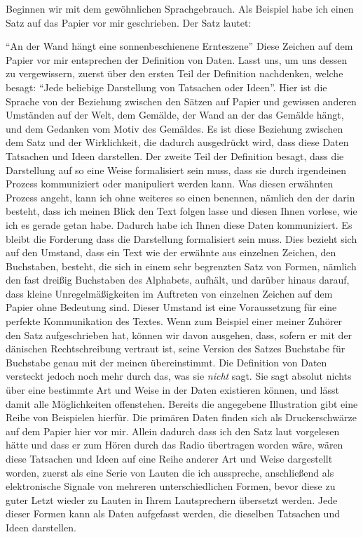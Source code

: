 {Beginnen wir mit dem gewöhnlichen Sprachgebrauch. Als Beispiel habe ich einen Satz auf das Papier vor mir geschrieben. Der Satz lautet: 

\enquote{An der Wand hängt eine sonnenbeschienene Ernteszene} Diese Zeichen auf dem Papier vor mir entsprechen der Definition von Daten. Lasst uns, um uns dessen zu vergewissern, zuerst über den ersten Teil der Definition nachdenken, welche besagt: \enquote{Jede beliebige Darstellung von Tatsachen oder Ideen}. Hier ist die Sprache von der Beziehung zwischen den Sätzen auf Papier und gewissen anderen Umständen auf der Welt, dem Gemälde, der Wand an der das Gemälde hängt, und dem Gedanken vom Motiv des Gemäldes. Es ist diese Beziehung zwischen dem Satz und der Wirklichkeit, die dadurch ausgedrückt wird, dass diese Daten Tatsachen und Ideen darstellen. Der zweite Teil der Definition besagt, dass die Darstellung auf so eine Weise formalisiert sein muss, dass sie durch irgendeinen Prozess kommuniziert oder manipuliert werden kann.
Was diesen erwähnten Prozess angeht, kann ich ohne weiteres so einen benennen, nämlich den der darin besteht, dass ich meinen Blick den Text folgen lasse und diesen Ihnen vorlese, wie ich es gerade getan habe. Dadurch habe ich Ihnen diese Daten kommuniziert.
Es bleibt die Forderung dass die Darstellung formalisiert sein muss. 
Dies bezieht sich auf den Umstand, dass ein Text wie der erwähnte aus einzelnen Zeichen, den Buchstaben, besteht, die sich in einem sehr begrenzten Satz von Formen, nämlich den fast dreißig Buchstaben des Alphabets, aufhält, und darüber hinaus darauf, dass kleine Unregelmäßigkeiten im Auftreten von einzelnen Zeichen auf dem Papier ohne Bedeutung sind.
Dieser Umstand ist eine Voraussetzung für eine perfekte Kommunikation des Textes. Wenn zum Beispiel einer meiner Zuhörer den Satz aufgeschrieben hat, können wir davon ausgehen, dass, sofern er mit der dänischen Rechtschreibung vertraut ist, seine Version des Satzes Buchstabe für Buchstabe genau mit der meinen übereinstimmt. Die Definition von Daten versteckt jedoch noch mehr durch das, was sie \emph{nicht} sagt. Sie sagt absolut nichts über eine bestimmte Art und Weise in der Daten existieren können, und lässt damit alle Möglichkeiten offenstehen. Bereits die angegebene Illustration gibt eine Reihe von Beispielen hierfür. Die primären Daten finden sich als Druckerschwärze auf dem Papier hier vor mir. Allein dadurch dass ich den Satz laut vorgelesen hätte und dass er zum Hören durch das Radio übertragen worden wäre, wären diese Tatsachen und Ideen auf eine Reihe anderer Art und Weise dargestellt worden, zuerst als eine Serie von Lauten die ich ausspreche, anschließend als elektronische Signale von mehreren unterschiedlichen Formen, bevor diese zu guter Letzt wieder zu Lauten in Ihrem Lautsprechern übersetzt werden. Jede dieser Formen kann als Daten aufgefasst werden, die dieselben Tatsachen und Ideen darstellen. 

}
